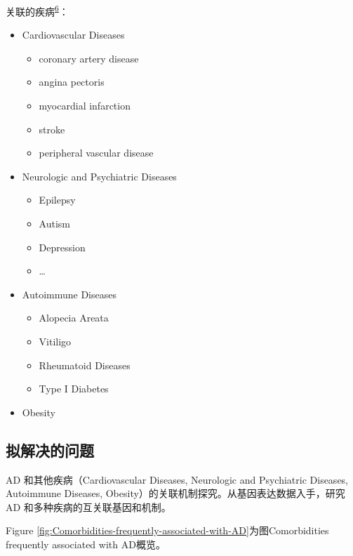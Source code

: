 \documentclass[
]{article}
\providecommand{\tightlist}{%
  \setlength{\itemsep}{0pt}\setlength{\parskip}{0pt}}
\begin{document}
关联的疾病\textsuperscript{\protect\hyperlink{ref-IsAtopicDermaMesjas2023}{6}}：

\begin{itemize}
\tightlist
\item
  Cardiovascular Diseases

  \begin{itemize}
  \tightlist
  \item
    coronary artery disease
  \item
    angina pectoris
  \item
    myocardial infarction
  \item
    stroke
  \item
    peripheral vascular disease
  \end{itemize}
\item
  Neurologic and Psychiatric Diseases

  \begin{itemize}
  \tightlist
  \item
    Epilepsy
  \item
    Autism
  \item
    Depression
  \item
    \ldots{}
  \end{itemize}
\item
  Autoimmune Diseases

  \begin{itemize}
  \tightlist
  \item
    Alopecia Areata
  \item
    Vitiligo
  \item
    Rheumatoid Diseases
  \item
    Type I Diabetes
  \end{itemize}
\item
  Obesity
\end{itemize}

\hypertarget{ux62dfux89e3ux51b3ux7684ux95eeux9898}{%
\subsection{拟解决的问题}\label{ux62dfux89e3ux51b3ux7684ux95eeux9898}}

AD 和其他疾病（Cardiovascular Diseases, Neurologic and Psychiatric Diseases, Autoimmune Diseases, Obesity）的关联机制探究。从基因表达数据入手，研究 AD 和多种疾病的互关联基因和机制。

Figure \ref{fig:Comorbidities-frequently-associated-with-AD}为图Comorbidities frequently associated with AD概览。
\end{document}
